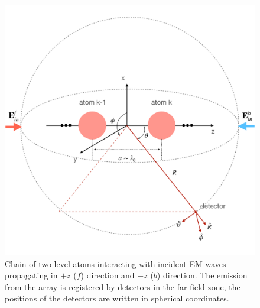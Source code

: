 \documentclass[aps,prl,twocolumn,superscriptaddress,showpacs,amsmath,amssymb]{revtex4-2}
\begin{document}
\begin{figure}[h]
    \centering
    \includegraphics[width=0.9\linewidth]{fig1_sketch}
    \caption{Chain of two-level atoms interacting with incident EM waves propagating in $+z$ ($f$) direction and $-z$ ($b$) direction. The emission from the array is registered by detectors in the far field zone, the positions of the detectors are written in spherical coordinates.}
    \label{fig:01}
\end{figure}
\end{document}
